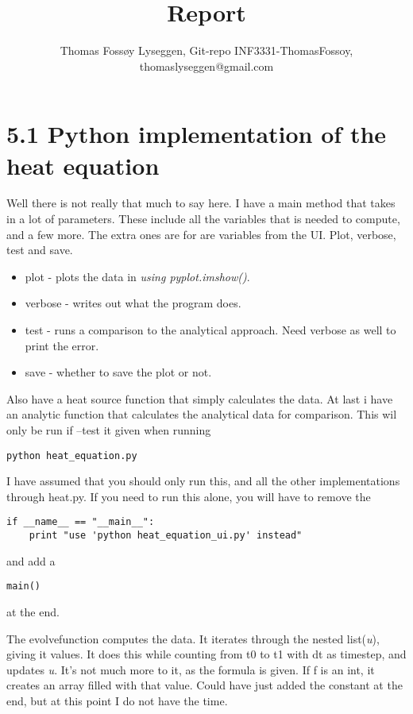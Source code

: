 \documentclass[a4paper]{article}
\title{Report}
\author{Thomas Fossøy Lyseggen, Git-repo INF3331-ThomasFossoy, {thomaslyseggen@gmail.com}}
\begin{document}
\maketitle



\section*{5.1 Python implementation of the heat equation}

Well there is not really that much to say here. I have a main method that takes in a lot of parameters. These include all the variables that is needed to compute, and a few more. The extra ones are for are variables from the UI. Plot, verbose, test and save. 
\begin{itemize}
\item  plot - plots the data in \emph{using pyplot.imshow()}. 
\item  verbose - writes out what the program does. 
\item  test - runs a comparison to the analytical approach. Need verbose as well to print the error.
\item  save - whether to save the plot or not. 
\end{itemize}

Also have a heat source function that simply calculates the data. At last i have an analytic function that calculates the analytical data for comparison. This wil only be run if --test it given when running 
\begin{verbatim}
python heat_equation.py 
\end{verbatim}

I have assumed that you should only run this, and all the other implementations through heat\textunderscoreequation\textunderscoreui.py. If you need to run this alone, you will have to remove the 
\begin{verbatim}
if __name__ == "__main__":
    print "use 'python heat_equation_ui.py' instead"
\end{verbatim}
and add a 
\begin{verbatim}
main()
\end{verbatim}
at the end. 

The evolve\textunderscorefunc function computes the data. It iterates through the nested list(\emph{u\textunderscorenew}), giving it values. It does this while counting from t0 to t1 with dt as timestep, and updates \emph{u}. It's not much more to it, as the formula is given. If f is an int, it creates an array filled with that value. Could have just added the constant at the end, but at this point I do not have the time.
\end{document}
